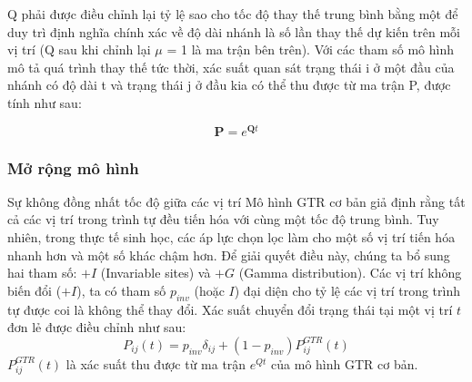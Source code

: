 \documentclass[12pt,a4paper]{report}
\begin{document}
Q phải được điều chỉnh lại tỷ lệ sao cho tốc độ thay thế trung bình bằng một để duy trì định nghĩa chính xác về độ dài nhánh là số lần thay thế dự kiến trên mỗi vị trí (Q sau khi chỉnh lại \(\mu\) = 1 là ma trận bên trên). Với các tham số mô hình mô tả quá trình thay thế tức thời, xác suất quan sát trạng thái i ở một đầu của nhánh có độ dài t và trạng thái j ở đầu kia có thể thu được từ ma trận P, được tính như sau:

\begin{equation}
    \label{eq:placeholder_label}
    \mathbf{P} = e^{\mathbf{Q}t}
\end{equation}

\subsubsection{Mở rộng mô hình}

Sự không đồng nhất tốc độ giữa các vị trí Mô hình GTR cơ bản giả định rằng tất cả các vị trí trong trình tự đều tiến hóa với cùng một tốc độ trung bình. Tuy nhiên, trong thực tế sinh học, các áp lực chọn lọc làm cho một số vị trí tiến hóa nhanh hơn và một số khác chậm hơn. Để giải quyết điều này, chúng ta bổ sung hai tham số: $+I$ (Invariable sites) và $+G$ (Gamma distribution). Các vị trí không biến đổi ($+I$), ta có tham số $p_{inv}$ (hoặc $I$) đại diện cho tỷ lệ các vị trí trong trình tự được coi là không thể thay đổi. Xác suất chuyển đổi trạng thái tại một vị trí $t$ đơn lẻ được điều chỉnh như sau:
\begin{equation}P_{ij}(t) = p_{inv} \delta_{ij} + (1 - p_{inv}) P_{ij}^{GTR}(t)
\end{equation}
$P_{ij}^{GTR}(t)$ là xác suất thu được từ ma trận $e^{Qt}$ của mô hình GTR cơ bản. 
\end{document}
